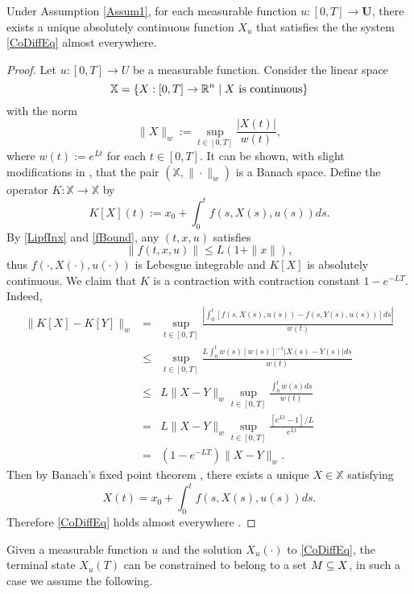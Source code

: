 \begin{theorem}\label{ExAdmisPair} 
	Under Assumption \ref{Assum1}, for each measurable function 
	$u:[0,T]\to \mathbf{U}$, there exists a unique absolutely continuous function $X_u$ that satisfies the the system 
	\eqref{CoDiffEq} almost everywhere. %
\end{theorem}
\begin{proof} Let $u:[0,T]\to U$ be a measurable function. Consider the linear space 
    \[\mathbb{X}=\{X:[0,T]\to \mathbb{R}^n\mid X \mbox{ is continuous}\}\] 
with the norm
    \[ \|X\|_w:=\sup_{t\in[0,T]} \frac{|X(t)|}{w(t)}, \]
where $w(t):=e^{Lt}$ for each $t\in [0,T]$. It can be shown, with slight modifications in \cite[Section 2.1]{Teschl}, that the pair $(\mathbb{X},\|\cdot\|_w)$ is a Banach space. Define the operator $K:\mathbb{X}\to \mathbb{X}$ by 
    \[ K[X](t):=x_0 + \int_0^t f(s,X(s),u(s))ds.\]
By \eqref{LipfInx} and \eqref{fBound}, any $(t,x,u)$ satisfies 
  \begin{equation}
      \|f(t,x,u)\| \leq  L(1+\|x\|),
  \end{equation}
thus $f(\cdot,X(\cdot),u(\cdot))$ is Lebesgue integrable and $K[X]$ is absolutely continuous. We claim that $K$ is a contraction with contraction constant $1-e^{-LT}$. Indeed,
    \begin{eqnarray*}
    \| K[X] - K[Y] \|_w & = & \sup_{t\in[0,T]} \frac{|\int_0^t [f(s,X(s),u(s)) -f(s,Y(s),u(s))]ds|}{w(t)}\\
        & \leq &   \sup_{t\in[0,T]} \frac{L\int_0^t w(s)[w(s)]^{-1}|X(s) -Y(s)|ds}{w(t)}\\
        &\leq &  L\|X-Y\|_w \sup_{t\in[0,T]} \frac{\int_0^t w(s)ds}{w(t)}\\
        & = &  L\|X-Y\|_w \sup_{t\in[0,T]}\frac{[e^{Lt}-1]/L}{e^{Lt}}\\
        & = &  (1-e^{-LT})\|X-Y\|_w. 
    \end{eqnarray*}
Then by Banach's fixed point theorem \cite[Theorem 2.1]{Teschl}, there exists a unique $X\in \mathbb{X}$ satisfying 
    \[ X(t)=x_0 + \int_0^t f(s,X(s),u(s))ds.\]
Therefore \eqref{CoDiffEq} holds almost everywhere \cite[Corollary 5.4.1]{Loeb2016}.
\end{proof}


	Given a measurable function $u$ and the solution $X_u(\cdot)$ to 
\eqref{CoDiffEq}, the terminal state $X_u(T)$ can be constrained to belong to a set $M\subseteq X$, in such a case we assume the following. 

